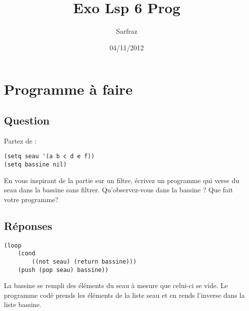 \documentclass[a4paper, 11pt]{article}
\title{Exo Lsp 6 Prog}
\author{Sarfraz \bsc{kapasi}}
\date{04/11/2012}
\begin{document}
%
\maketitle
%
\section{Programme à faire}
\subsection{Question}
Partez de :
\begin{lstlisting}
(setq seau '(a b c d e f))
(setq bassine nil)
\end{lstlisting}
En vous inspirant de la partie sur un filtre, écrivez un programme qui verse du seau dans la bassine sans filtrer.
Qu'observez-vous dans la bassine ?
Que fait votre programme?
\subsection{Réponses}
\begin{lstlisting}
(loop
    (cond
        ((not seau) (return bassine)))
    (push (pop seau) bassine))
\end{lstlisting}
La bassine se rempli des éléments du seau à mesure que celui-ci se vide.
Le programme codé prends les éléments de la liste seau et en rends l'inverse dans la liste bassine.
%
\end{document}
